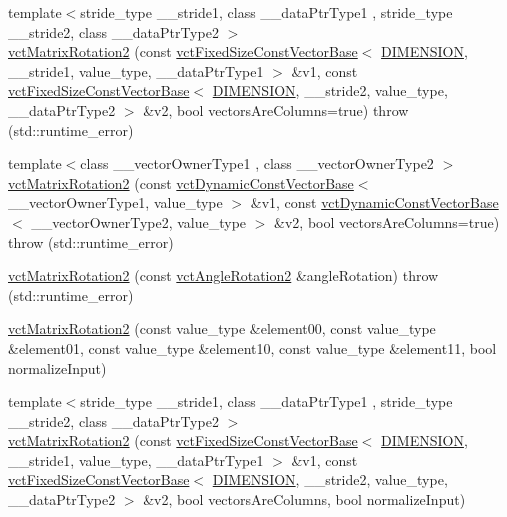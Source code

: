 \begin{DoxyCompactItemize}
{\footnotesize template$<$stride\+\_\+type \+\_\+\+\_\+stride1, class \+\_\+\+\_\+data\+Ptr\+Type1 , stride\+\_\+type \+\_\+\+\_\+stride2, class \+\_\+\+\_\+data\+Ptr\+Type2 $>$ }\\\hyperlink{classvct_matrix_rotation2_a85adcb73000e860378122edc454c253d}{vct\+Matrix\+Rotation2} (const \hyperlink{classvct_fixed_size_const_vector_base}{vct\+Fixed\+Size\+Const\+Vector\+Base}$<$ \hyperlink{group__cisst_vector_ggadb5878f342cf4be98c9e6d79e9ae359ba3641e8aa72f502ddb4dc582365767927}{D\+I\+M\+E\+N\+S\+I\+O\+N}, \+\_\+\+\_\+stride1, value\+\_\+type, \+\_\+\+\_\+data\+Ptr\+Type1 $>$ \&v1, const \hyperlink{classvct_fixed_size_const_vector_base}{vct\+Fixed\+Size\+Const\+Vector\+Base}$<$ \hyperlink{group__cisst_vector_ggadb5878f342cf4be98c9e6d79e9ae359ba3641e8aa72f502ddb4dc582365767927}{D\+I\+M\+E\+N\+S\+I\+O\+N}, \+\_\+\+\_\+stride2, value\+\_\+type, \+\_\+\+\_\+data\+Ptr\+Type2 $>$ \&v2, bool vectors\+Are\+Columns=true)  throw (std\+::runtime\+\_\+error)
\item 
{\footnotesize template$<$class \+\_\+\+\_\+vector\+Owner\+Type1 , class \+\_\+\+\_\+vector\+Owner\+Type2 $>$ }\\\hyperlink{classvct_matrix_rotation2_accc53b158c75c8972a5fab7a56984550}{vct\+Matrix\+Rotation2} (const \hyperlink{classvct_dynamic_const_vector_base}{vct\+Dynamic\+Const\+Vector\+Base}$<$ \+\_\+\+\_\+vector\+Owner\+Type1, value\+\_\+type $>$ \&v1, const \hyperlink{classvct_dynamic_const_vector_base}{vct\+Dynamic\+Const\+Vector\+Base}$<$ \+\_\+\+\_\+vector\+Owner\+Type2, value\+\_\+type $>$ \&v2, bool vectors\+Are\+Columns=true)  throw (std\+::runtime\+\_\+error)
\item 
\hyperlink{classvct_matrix_rotation2_a752755ebba0ba8da35646e61f85345ac}{vct\+Matrix\+Rotation2} (const \hyperlink{classvct_angle_rotation2}{vct\+Angle\+Rotation2} \&angle\+Rotation)  throw (std\+::runtime\+\_\+error)
\item 
\hyperlink{classvct_matrix_rotation2_af9c21a048adcf506a61b298e51224ceb}{vct\+Matrix\+Rotation2} (const value\+\_\+type \&element00, const value\+\_\+type \&element01, const value\+\_\+type \&element10, const value\+\_\+type \&element11, bool normalize\+Input)
\item 
{\footnotesize template$<$stride\+\_\+type \+\_\+\+\_\+stride1, class \+\_\+\+\_\+data\+Ptr\+Type1 , stride\+\_\+type \+\_\+\+\_\+stride2, class \+\_\+\+\_\+data\+Ptr\+Type2 $>$ }\\\hyperlink{classvct_matrix_rotation2_a4eba73f44c9fedf50c4cfd901c0d1cb9}{vct\+Matrix\+Rotation2} (const \hyperlink{classvct_fixed_size_const_vector_base}{vct\+Fixed\+Size\+Const\+Vector\+Base}$<$ \hyperlink{group__cisst_vector_ggadb5878f342cf4be98c9e6d79e9ae359ba3641e8aa72f502ddb4dc582365767927}{D\+I\+M\+E\+N\+S\+I\+O\+N}, \+\_\+\+\_\+stride1, value\+\_\+type, \+\_\+\+\_\+data\+Ptr\+Type1 $>$ \&v1, const \hyperlink{classvct_fixed_size_const_vector_base}{vct\+Fixed\+Size\+Const\+Vector\+Base}$<$ \hyperlink{group__cisst_vector_ggadb5878f342cf4be98c9e6d79e9ae359ba3641e8aa72f502ddb4dc582365767927}{D\+I\+M\+E\+N\+S\+I\+O\+N}, \+\_\+\+\_\+stride2, value\+\_\+type, \+\_\+\+\_\+data\+Ptr\+Type2 $>$ \&v2, bool vectors\+Are\+Columns, bool normalize\+Input)

\end{DoxyCompactItemize}
